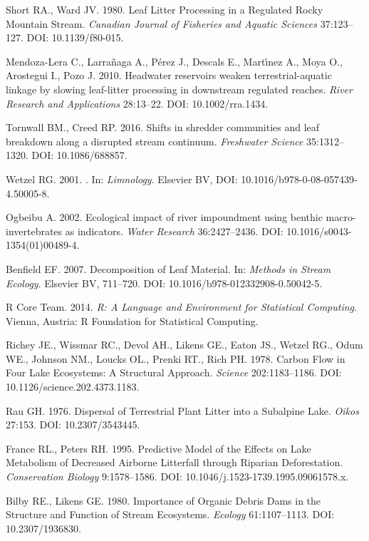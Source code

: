 \documentclass[12pt,letter]{article}
\begin{document}
\label{csl:28}Short RA., Ward JV. 1980. {Leaf Litter Processing in a Regulated Rocky Mountain Stream}. \textit{Canadian Journal of Fisheries and Aquatic Sciences} 37:123–127. DOI: 10.1139/f80-015.

\label{csl:29}Mendoza-Lera C., Larra{\~{n}}aga A., P{\'{e}}rez J., Descals E., Mart{\'{\i}}nez A., Moya O., Arostegui I., Pozo J. 2010. {Headwater reservoirs weaken terrestrial-aquatic linkage by slowing leaf-litter processing in downstream regulated reaches}. \textit{River Research and Applications} 28:13–22. DOI: 10.1002/rra.1434.

\label{csl:30}Tornwall BM., Creed RP. 2016. {Shifts in shredder communities and leaf breakdown along a disrupted stream continuum}. \textit{Freshwater Science} 35:1312–1320. DOI: 10.1086/688857.

\label{csl:31}Wetzel RG. 2001. {}. In: \textit{Limnology}. Elsevier {BV}, DOI: 10.1016/b978-0-08-057439-4.50005-8.

\label{csl:32}Ogbeibu A. 2002. {Ecological impact of river impoundment using benthic macro-invertebrates as indicators}. \textit{Water Research} 36:2427–2436. DOI: 10.1016/s0043-1354(01)00489-4.

\label{csl:33}Benfield EF. 2007. {Decomposition of Leaf Material}. In: \textit{Methods in Stream Ecology}. Elsevier {BV}, 711–720. DOI: 10.1016/b978-012332908-0.50042-5.

\label{csl:34}{R Core Team}. 2014. \textit{{R: A Language and Environment for Statistical Computing}}. Vienna, Austria: R Foundation for Statistical Computing.

\label{csl:35}Richey JE., Wissmar RC., Devol AH., Likens GE., Eaton JS., Wetzel RG., Odum WE., Johnson NM., Loucks OL., Prenki RT., Rich PH. 1978. {Carbon Flow in Four Lake Ecosystems: A Structural Approach}. \textit{Science} 202:1183–1186. DOI: 10.1126/science.202.4373.1183.

\label{csl:36}Rau GH. 1976. {Dispersal of Terrestrial Plant Litter into a Subalpine Lake}. \textit{Oikos} 27:153. DOI: 10.2307/3543445.

\label{csl:37}France RL., Peters RH. 1995. {Predictive Model of the Effects on Lake Metabolism of Decreased Airborne Litterfall through Riparian Deforestation}. \textit{Conservation Biology} 9:1578–1586. DOI: 10.1046/j.1523-1739.1995.09061578.x.

\label{csl:38}Bilby RE., Likens GE. 1980. {Importance of Organic Debris Dams in the Structure and Function of Stream Ecosystems}. \textit{Ecology} 61:1107–1113. DOI: 10.2307/1936830.
\end{document}
